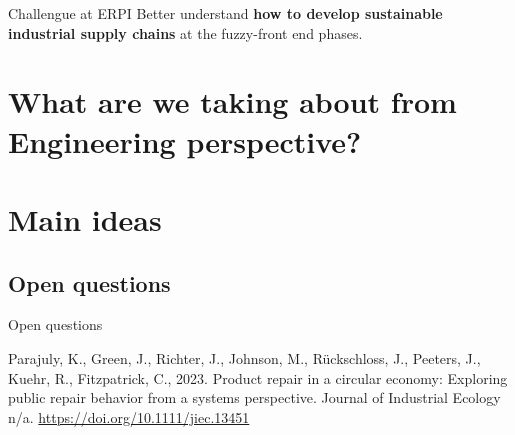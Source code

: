 \documentclass[
  11pt,
  ignorenonframetext,
  aspectratio=169,
  c]{beamer}
\newlength{\cslhangindent}
\newenvironment{CSLReferences}[2] %
 {\begin{list}{}{%
  \setlength{\itemindent}{0pt}
  \setlength{\leftmargin}{0pt}
  \setlength{\parsep}{0pt}
  \ifodd #1
   \setlength{\leftmargin}{\cslhangindent}
   \setlength{\itemindent}{-1\cslhangindent}
  \fi
  \setlength{\itemsep}{#2\baselineskip}}}
 {\end{list}}
\begin{document}
\begin{frame}{Challengue at ERPI}
\label{challengue-at-erpi}
Better understand \textbf{how to develop sustainable industrial supply
chains} at the fuzzy-front end phases.
\end{frame}

\section{What are we taking about from Engineering
perspective?}\label{what-are-we-taking-about-from-engineering-perspective}

\section{Main ideas}\label{main-ideas}

\subsection*{Open questions}\label{open-questions}

\begin{frame}{Open questions}
\label{refs}
\begin{CSLReferences}{1}{0}
Parajuly, K., Green, J., Richter, J., Johnson, M., Rückschloss, J.,
Peeters, J., Kuehr, R., Fitzpatrick, C., 2023. Product repair in a
circular economy: {Exploring} public repair behavior from a systems
perspective. Journal of Industrial Ecology n/a.
\url{https://doi.org/10.1111/jiec.13451}

\end{CSLReferences}
\end{frame}
\end{document}
